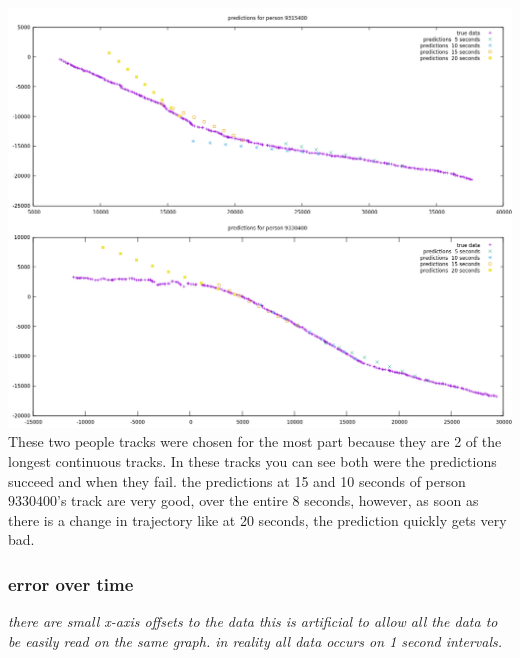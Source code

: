 \documentclass[10pt,a4paper]{article}
\begin{document}
\includegraphics[width=\textwidth]{../graphs/person_tracks.png}\\
These two people tracks were chosen for the most part because they are 2 of the longest continuous tracks. In these tracks you can see both were the predictions succeed and when they fail. the predictions at 15 and 10 seconds of person $9330400$'s track are very good, over the entire 8 seconds, however, as soon as there is a change in trajectory like at 20 seconds, the prediction quickly gets very bad.

\subsubsection{error over time}
\textit{there are small x-axis offsets to the data this is artificial to allow all the data to be easily read on the same graph. in reality all data occurs on 1 second intervals.}
\end{document}
